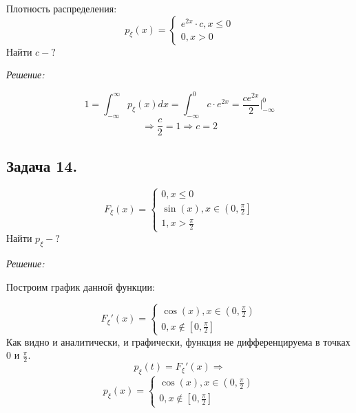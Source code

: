 Плотность распределения:
\[
p_{\xi}(x) =
\begin{cases}
	e^{2x} \cdot c, x \le 0 \\
	0, x > 0
\end{cases}
\]
Найти $c - ?$

\noindent \textit{Решение:}

\[ 1 = \int_{-\infty}^{\infty} p_{\xi} (x) dx = \int_{-\infty}^{0} c \cdot e^{2x} = \frac{ce^{2x}}{2} \bigg|_{-\infty}^0 \]
\[ \Rightarrow \frac{c}{2} = 1 \Rightarrow c = 2 \]

\subsection*{Задача 14.}

\[
F_{\xi}(x) =
\begin{cases}
	0, x \le 0 \\
	\sin(x), x \in \left(0, \frac{\pi}{2}\right] \\
	1, x > \frac{\pi}{2}
\end{cases}
\]
Найти $p_{\xi} - ?$

\noindent \textit{Решение:}

Построим график данной функции:
\begin{figure}[H]
\end{figure}
\[
F_{\xi}'(x) =
\begin{cases}
	\cos(x), x \in \left(0, \frac{\pi}{2}\right) \\
	0, x \notin \left[0, \frac{\pi}{2}\right]
\end{cases}
\]
Как видно и аналитически, и графически, функция не дифференцируема в точках 0 и $\frac{\pi}{2}$.
\[ p_{\xi}(t) = F_{\xi}'(x) \Rightarrow \]
\[
p_{\xi}(x) =
\begin{cases}
	\cos(x), x \in \left(0, \frac{\pi}{2}\right) \\
	0, x \notin \left[0, \frac{\pi}{2}\right]
\end{cases}
\]

